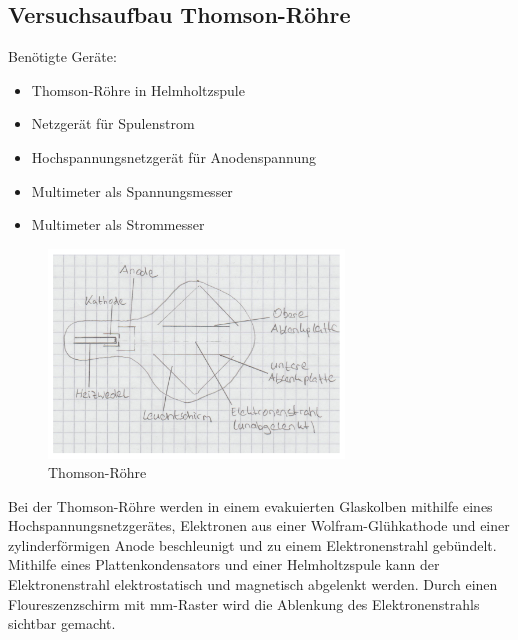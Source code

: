 \documentclass[a4paper,10pt]{scrartcl}
\begin{document}
	\subsection{Versuchsaufbau Thomson-Röhre}
	Benötigte Geräte:
	\begin{itemize}
\item Thomson-Röhre in Helmholtzspule
\item Netzgerät für Spulenstrom
\item Hochspannungsnetzgerät für Anodenspannung
\item Multimeter als Spannungsmesser
\item Multimeter als Strommesser
\end{itemize}
\begin{figure}[h]
\centering
\includegraphics[width=0.7\textwidth]{./Bilder/emthomson}
\caption{Thomson-Röhre}
\end{figure}
Bei der Thomson-Röhre werden in einem evakuierten Glaskolben mithilfe eines Hochspannungsnetzgerätes, Elektronen aus einer Wolfram-Glühkathode und einer zylinderförmigen Anode beschleunigt und zu einem Elektronenstrahl gebündelt. Mithilfe eines Plattenkondensators und einer Helmholtzspule kann der Elektronenstrahl elektrostatisch und magnetisch abgelenkt werden. Durch einen Floureszenzschirm mit mm-Raster wird die Ablenkung des Elektronenstrahls sichtbar gemacht.
\FloatBarrier
\end{document}
